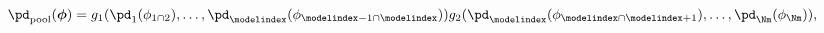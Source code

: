 \begin{equation}
  \pd_{\text{pool}}(\boldsymbol{\phi}) = 
  g_{1}(\pd_{1}(\phi_{1 \cap 2}), \ldots, \pd_{\modelindex}(\phi_{\modelindex - 1 \cap \modelindex}))
  g_{2}(\pd_{\modelindex}(\phi_{\modelindex \cap \modelindex + 1}), \ldots, \pd_{\Nm}(\phi_{\Nm})),
  \label{eqn:pooled-prior-split-def}
\end{equation}